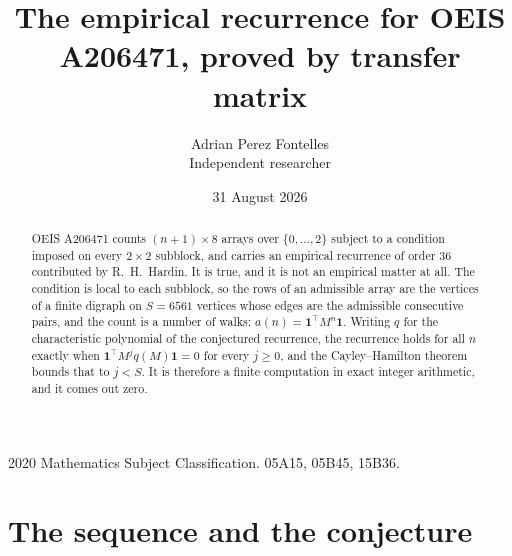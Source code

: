 \documentclass[11pt,a4paper]{article}
\title{The empirical recurrence for OEIS A206471, proved by transfer matrix}
\author{Adrian Perez Fontelles\\ \small Independent researcher}
\date{31 August 2026}
\theoremstyle{plain}
\theoremstyle{definition}
\begin{document}
\maketitle

\begin{abstract}
OEIS A206471 counts $(n+1)\times8$ arrays over $\{0,\dots,2\}$ subject to a condition imposed on
every $2\times2$ subblock, and carries an empirical recurrence of order $36$ contributed
by R.~H.~Hardin. It is true, and it is not an empirical matter at all. The condition is local
to each subblock, so the rows of an admissible array are the vertices of a finite digraph
on $S=6561$ vertices whose edges are the admissible consecutive pairs, and the count is a
number of walks: $a(n)=\mathbf{1}^{\!\top}M^{n}\mathbf{1}$. Writing $q$
for the characteristic polynomial of the conjectured recurrence, the recurrence holds for all
$n$ exactly when $\mathbf{1}^{\!\top}M^{j}q(M)\mathbf{1}=0$ for every $j\ge0$, and the
Cayley--Hamilton theorem bounds that to $j<S$. It is therefore a finite computation in exact
integer arithmetic, and it comes out zero.
\end{abstract}

\noindent\small 2020 Mathematics Subject Classification. 05A15, 05B45, 15B36.\normalsize

\section{The sequence and the conjecture}
\end{document}
